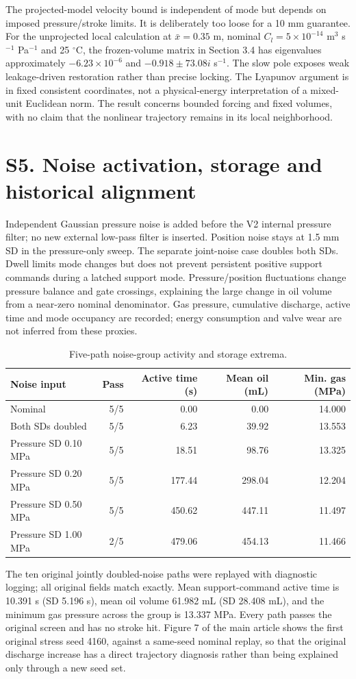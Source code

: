\documentclass[11pt,a4paper]{article}
\begin{document}
The projected-model velocity bound is independent of mode but depends on imposed pressure/stroke limits. It is deliberately too loose for a 10 mm guarantee. For the unprojected local calculation at $\bar x=0.35$ m, nominal $C_l=5\times10^{-14}$ m$^3$ s$^{-1}$ Pa$^{-1}$ and 25 $^\circ$C, the frozen-volume matrix in Section 3.4 has eigenvalues approximately $-6.23\times10^{-6}$ and $-0.918\pm73.08i$ s$^{-1}$. The slow pole exposes weak leakage-driven restoration rather than precise locking. The Lyapunov argument is in fixed consistent coordinates, not a physical-energy interpretation of a mixed-unit Euclidean norm. The result concerns bounded forcing and fixed volumes, with no claim that the nonlinear trajectory remains in its local neighborhood.

\section*{S5. Noise activation, storage and historical alignment}
Independent Gaussian pressure noise is added before the V2 internal pressure filter; no new external low-pass filter is inserted. Position noise stays at 1.5 mm SD in the pressure-only sweep. The separate joint-noise case doubles both SDs. Dwell limits mode changes but does not prevent persistent positive support commands during a latched support mode. Pressure/position fluctuations change pressure balance and gate crossings, explaining the large change in oil volume from a near-zero nominal denominator. Gas pressure, cumulative discharge, active time and mode occupancy are recorded; energy consumption and valve wear are not inferred from these proxies.
\begin{table}[H]\centering\caption{Five-path noise-group activity and storage extrema.}\begin{tabularx}{\linewidth}{Xrrrr}\toprule Noise input & Pass & Active time (s) & Mean oil (mL) & Min. gas (MPa)\\\midrule
Nominal & 5/5 & 0.00 & 0.00 & 14.000 \\
Both SDs doubled & 5/5 & 6.23 & 39.92 & 13.553 \\
Pressure SD 0.10 MPa & 5/5 & 18.51 & 98.76 & 13.325 \\
Pressure SD 0.20 MPa & 5/5 & 177.44 & 298.04 & 12.204 \\
Pressure SD 0.50 MPa & 5/5 & 450.62 & 447.11 & 11.497 \\
Pressure SD 1.00 MPa & 2/5 & 479.06 & 454.13 & 11.466 \\
\bottomrule\end{tabularx}\end{table}
The ten original jointly doubled-noise paths were replayed with diagnostic logging; all original fields match exactly. Mean support-command active time is 10.391 s (SD 5.196 s), mean oil volume 61.982 mL (SD 28.408 mL), and the minimum gas pressure across the group is 13.337 MPa. Every path passes the original screen and has no stroke hit. Figure 7 of the main article shows the first original stress seed 4160, against a same-seed nominal replay, so that the original discharge increase has a direct trajectory diagnosis rather than being explained only through a new seed set.
\end{document}
